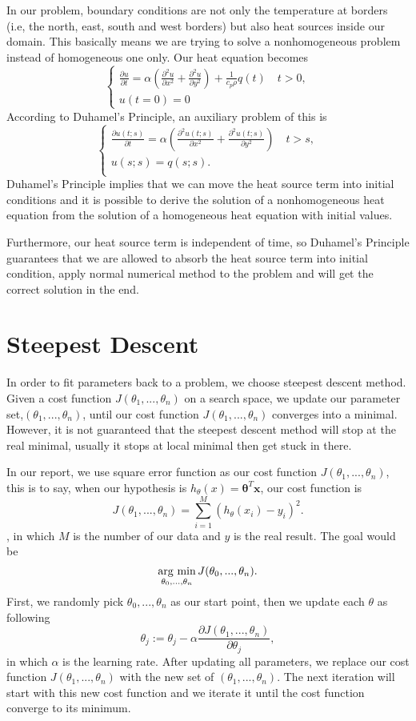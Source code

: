 \documentclass[10pt,a4paper]{report}
\newcommand{\argmin}{\mathop{\rm arg~min}\limits}
\begin{document}
In our problem, boundary conditions are not only the temperature at borders (i.e, the north, east, south and west borders) but also heat sources inside our domain. This basically means we are trying to solve a nonhomogeneous problem instead of homogeneous one only. Our heat equation becomes
\[
\begin{cases}
 {\frac{\partial u}{\partial t}}=\alpha({\frac{\partial^2 u}{\partial x^2}}+{\frac{\partial^2 u}{\partial y^2}})+{\frac{1}{c_p \rho}}q(t) \quad t>0,\\
 u(t=0)=0
\end{cases}
\]  
According to Duhamel's Principle, an auxiliary problem of this is   
\[
\begin{cases}
 {\frac{\partial u(t;s)}{\partial t}}=\alpha({\frac{\partial^2 u(t;s)}{\partial x^2}}+{\frac{\partial^2 u(t;s)}{\partial y^2}}) \quad t>s,\\
 u(s;s)=q(s;s).\\
\end{cases}  
\]
Duhamel's Principle implies that we can move the heat source term into initial conditions and it is possible to derive the solution of a nonhomogeneous heat equation from the solution of a homogeneous heat equation with initial values.

Furthermore, our heat source term is independent of time, so Duhamel's Principle guarantees that we are allowed to absorb the heat source term into initial condition, apply normal numerical method to the problem and will get the correct solution in the end.

\section{Steepest Descent}

In order to fit parameters back to a problem, we choose steepest descent method. Given a cost function $J(\theta_1,...,\theta_n)$ on a search space, we update our parameter set,$(\theta_1,...,\theta_n)$, until our cost function $J(\theta_1,...,\theta_n)$ converges into a minimal. However, it is not guaranteed that the steepest descent method will stop at the real minimal, usually it stops at local minimal then get stuck in there.

In our report, we use square error function as our cost function $J(\theta_1,...,\theta_n)$, this is to say, when our hypothesis is $h_\theta(x)=\mathbf{\theta}^T \mathbf{x}$, our cost function is \[J(\theta_1,...,\theta_n)= \sum\limits_{i=1}^M (h_\theta(x_i)-y_i)^2          .\] 
, in which $M$ is the number of our data and $y$ is the real result. The goal would be \[\argmin_{\theta_0,...,\theta_n}J(\theta_0,...,\theta_n).\]  
First, we randomly pick $\theta_0,...,\theta_n$ as our start point, then we update each $\theta$ as following \[\theta_j := \theta_j - \alpha{\frac{\partial J(\theta_1,...,\theta_n)}{\partial \theta_j}},\] in which $\alpha$ is the learning rate. After updating all parameters, we replace our cost function $J(\theta_1,...,\theta_n)$ with the new set of $(\theta_1,...,\theta_n)$. The next iteration will start with this new cost function and we iterate it until the cost function converge to its minimum. 
\end{document}
